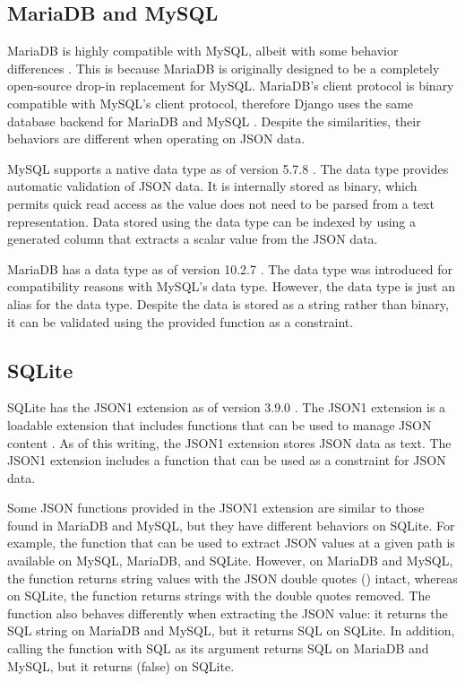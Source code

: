 \subsection{MariaDB and MySQL}

MariaDB is highly compatible with MySQL, albeit with some behavior differences
\cite{mariadb:compatibility}. This is because MariaDB is originally designed to
be a completely open-source drop-in replacement for MySQL. MariaDB's client
protocol is binary compatible with MySQL's client protocol, therefore Django
uses the same database backend for MariaDB and MySQL \cite{django:databases}.
Despite the similarities, their behaviors are different when operating on JSON
data.

MySQL supports a native  data type as of version 5.7.8
\cite{mysql:json}. The  data type provides automatic validation of
JSON data. It is internally stored as binary, which permits quick read access
as the value does not need to be parsed from a text representation. Data stored
using the  data type can be indexed by using a generated column that
extracts a scalar value from the JSON data.

MariaDB has a  data type as of version 10.2.7 \cite{mariadb:json}.
The  data type was introduced for compatibility reasons with MySQL's
 data type. However, the  data type is just an alias for
the  data type. Despite the data is stored as a string rather
than binary, it can be validated using the provided  function
as a  constraint.

\subsection{SQLite}

SQLite has the JSON1 extension as of version 3.9.0 \cite{sqlite:3.9.0}. The
JSON1 extension is a loadable extension that includes functions that can be
used to manage JSON content \cite{sqlite:json1}. As of this writing, the JSON1
extension stores JSON data as text. The JSON1 extension includes a
 function that can be used as a  constraint for
JSON data.

Some JSON functions provided in the JSON1 extension are similar to those found
in MariaDB and MySQL, but they have different behaviors on SQLite. For example,
the  function that can be used to extract JSON values at a
given path is available on MySQL, MariaDB, and SQLite. However, on MariaDB and
MySQL, the function returns string values with the JSON double quotes
() intact, whereas on SQLite, the function returns strings with the
double quotes removed. The function also behaves differently when extracting
the JSON  value: it returns the SQL string  on
\mbox{MariaDB} and MySQL, but it returns SQL  on SQLite. In
addition, calling the  function with SQL  as its
argument returns SQL  on MariaDB and MySQL, but it returns 
(false) on SQLite.

